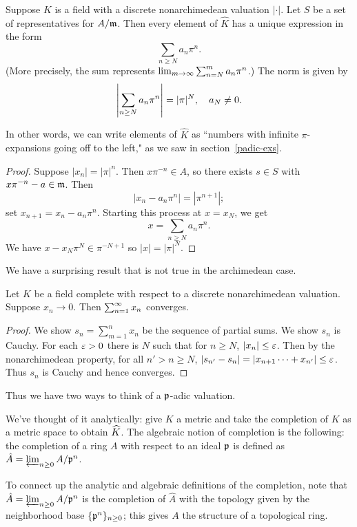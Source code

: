 \begin{pr}
Suppose $K$ is a field with a discrete nonarchimedean valuation $|\cdot|$. 
Let $S$ be a set of representatives for $A/\mathfrak{m}$. Then every element of $\hat K$ has a unique expression in the form
\[
\sum_{n\ge N} a_n \pi^n.
\]
(More precisely, the sum represents $\lim_{m\to \infty}\sum_{n=N}^{m}a_n\pi^n$.) 
The norm is given by
\[
\left| {\sum_{n\ge N} a_n \pi^n} \right|=|\pi|^{N},\quad a_{N}\ne0.
\]
\end{pr}
In other words, we can write elements of $\hat{K}$ as ``numbers with infinite $\pi$-expansions going off to the left," as we saw in section~\ref{padic-exs}.
\begin{proof}
Suppose $|x_n|=|\pi|^n$. Then $x\pi^{-n}\in A$, so there exists $s\in S$ with $x\pi^{-n}-a\in \mathfrak{m}$. Then 
\[
|x_n-a_n\pi^n|=|\pi^{n+1}|;
\]
set $x_{n+1}=x_n-a_n\pi^n$. Starting this process at $x=x_N$, we get 
\[
x=\sum_{n\ge N} a_n\pi^n.
\]
We have $x-x_N\pi^N\in \pi^{-N+1}$ so $|x|=|\pi|^{N}$.
\end{proof}
We have a surprising result that is not true in the archimedean case.
\begin{pr}
Let $K$ be a field complete with respect to a discrete nonarchimedean valuation. 
Suppose $x_n\to 0$. Then $\sum_{n=1}^{\infty} x_n$ converges.
\end{pr}
\begin{proof}
We show $s_n=\sum_{m=1}^n x_n$ be the sequence of partial sums. We show $s_n$ is Cauchy. For each $\varepsilon>0$ there is $N$ such that for $n\ge N$, $|x_n|\le \varepsilon$. Then by the nonarchimedean property, for all $n'>n\ge N$, $|s_{n'}-s_n|=|x_{n+1}\cdots +x_{n'}|\le \varepsilon$. Thus $s_n$ is Cauchy and hence converges.
\end{proof}
Thus we have two ways to think of a $\mathfrak{p}$-adic valuation.

We've thought of it analytically: give $K$ a metric and take the completion of $K$ as a metric space to obtain $\widehat{K}$. 
The algebraic notion of completion is the following: the completion of a ring $A$ with respect to an ideal $\mathfrak{p}$ is defined as $\hat{A}=\varprojlim_{n\ge 0} A/\mathfrak{p}^n$.

To connect up the analytic and algebraic definitions of the completion, note that 
$\hat{A}=\varprojlim_{n\ge 0} A/\mathfrak{p}^n$ is the completion of $\hat{A}$ with the topology given by the neighborhood base $\{\mathfrak{p}^n\}_{n\ge 0}$; this gives $A$ the structure of a topological ring.

